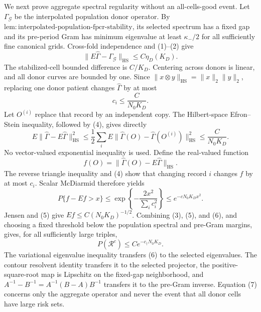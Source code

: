 We next prove aggregate spectral regularity without an all-cells-good event. Let \(\Gamma_{\mathcal G}\) be the interpolated population donor operator. By \(\mathrm{lem:interpolated\mbox{-}population\mbox{-}fpcr\mbox{-}stability}\), its selected spectrum has a fixed gap and its pre-period Gram has minimum eigenvalue at least \(\kappa_-/2\) for all sufficiently fine canonical grids. Cross-fold independence and (1)--(2) give
\[
 \|E\widehat\Gamma-\Gamma_{\mathcal G}\|_{\mathrm{HS}}
 \le C\eta_D(K_D).                                      \tag{3}
\]
The stabilized-cell bounded difference is \(C/K_D\). Centering across donors is linear, and all donor curves are bounded by one. Since \(\|x\otimes y\|_{\mathrm{HS}}=\|x\|_2\|y\|_2\), replacing one donor patient changes \(\widehat\Gamma\) by at most
\[
 c_i\le\frac{C}{N_0K_D}.                                 \tag{4}
\]
Let \(O^{(i)}\) replace that record by an independent copy. The Hilbert-space Efron--Stein inequality, followed by (4), gives directly
\[
 E\|\widehat\Gamma-E\widehat\Gamma\|_{\mathrm{HS}}^2
 \le\frac12\sum_iE\|\widehat\Gamma(O)-
                    \widehat\Gamma(O^{(i)})\|_{\mathrm{HS}}^2
 \le\frac{C}{N_0K_D}.                                   \tag{5}
\]
No vector-valued exponential inequality is used. Define the real-valued function
\[
 f(O)=\|\widehat\Gamma(O)-E\widehat\Gamma\|_{\mathrm{HS}}.
\]
The reverse triangle inequality and (4) show that changing record \(i\) changes \(f\) by at most \(c_i\). Scalar McDiarmid therefore yields
\[
 P\{f-Ef>x\}\le
 \exp\left\{-\frac{2x^2}{\sum_i c_i^2}\right\}
 \le e^{-cN_0K_Dx^2}.                                    \tag{6}
\]
Jensen and (5) give \(Ef\le C(N_0K_D)^{-1/2}\). Combining (3), (5), and (6), and choosing a fixed threshold below the population spectral and pre-Gram margins, gives, for all sufficiently large triples,
\[
 P(\mathcal R^c)\le Ce^{-c_\dagger N_0K_D}.              \tag{7}
\]
The variational eigenvalue inequality transfers (6) to the selected eigenvalues. The contour resolvent identity transfers it to the selected projector, the positive-square-root map is Lipschitz on the fixed-gap neighborhood, and \(A^{-1}-B^{-1}=A^{-1}(B-A)B^{-1}\) transfers it to the pre-Gram inverse. Equation (7) concerns only the aggregate operator and never the event that all donor cells have large risk sets.

